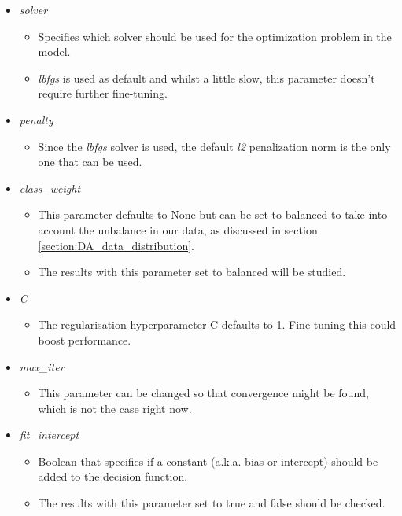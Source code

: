 \begin{itemize}
    \item \emph{solver}
    \begin{itemize}
        \item Specifies which solver should be used for the optimization problem in the model.
        \item \emph{lbfgs} is used as default and whilst a little slow, this parameter doesn't require further fine-tuning.
    \end{itemize}
    \item \emph{penalty}
    \begin{itemize}
        \item Since the \emph{lbfgs} solver is used, the default \emph{l2} penalization norm is the only one that can be used.
    \end{itemize}
    \item \emph{class\_weight}
    \begin{itemize}
        \item This parameter defaults to None but can be set to balanced to take into account the unbalance in our data, as discussed in section \ref{section:DA_data_distribution}.
        \item The results with this parameter set to balanced will be studied.
    \end{itemize}
    \item \emph{C}
    \begin{itemize}
        \item The regularisation hyperparameter C defaults to 1. Fine-tuning this could boost performance.
    \end{itemize}
    \item \emph{max\_iter}
    \begin{itemize}
        \item This parameter can be changed so that convergence might be found, which is not the case right now.
    \end{itemize}
    \item \emph{fit\_intercept}
    \begin{itemize}
        \item Boolean that specifies if a constant (a.k.a. bias or intercept) should be added to the decision function.
        \item The results with this parameter set to true and false should be checked.
    \end{itemize}
\end{itemize}